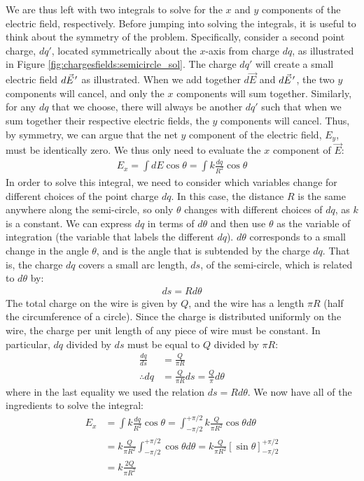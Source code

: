 We are thus left with two integrals to solve for the $x$ and $y$ components of the electric field, respectively. Before jumping into solving the integrals, it is useful to think about the symmetry of the problem. Specifically, consider a second point charge, $dq'$, located symmetrically about the $x$-axis from charge $dq$, as illustrated in Figure \ref{fig:chargesfields:semicircle_sol}. The charge $dq'$ will create a small electric field $d\pvec E'$ as illustrated. When we add together $d\vec E$ and $d\pvec E'$, the two $y$ components will cancel, and only the $x$ components will sum together. Similarly, for any $dq$ that we choose, there will always be another $dq'$ such that when we sum together their respective electric fields, the $y$ components will cancel. Thus, by symmetry, we can argue that the net $y$ component of the electric field, $E_y$, must be identically zero. We thus only need to evaluate the $x$ component of $\vec E$:
\begin{align*}
E_x = \int dE\cos\theta = \int k\frac{dq}{R^2} \cos\theta
\end{align*}
In order to solve this integral, we need to consider which variables change for different choices of the point charge $dq$. In this case, the distance $R$ is the same anywhere along the semi-circle, so only $\theta$ changes with different choices of $dq$, as $k$ is a constant. We can express $dq$ in terms of $d\theta$ and then use $\theta$ as the variable of integration (the variable that labels the different $dq$). $d\theta$ corresponds to a small change in the angle $\theta$, and is the angle that is subtended by the charge $dq$. That is, the charge $dq$ covers a small arc length, $ds$, of the semi-circle, which is related to $d\theta$ by:
\begin{align*}
ds = Rd\theta
\end{align*}
The total charge on the wire is given by $Q$, and the wire has a length $\pi R$ (half the circumference of a circle). Since the charge is distributed uniformly on the wire, the charge per unit length of any piece of wire must be constant. In particular, $dq$ divided by $ds$ must be equal to $Q$ divided by $\pi R$:
\begin{align*}
\frac{dq}{ds}&=\frac{Q}{\pi R}\\
\therefore dq &=\frac{Q}{\pi R}ds=\frac{Q}{\pi}d\theta
\end{align*}
where in the last equality we used the relation $ds=Rd\theta$. We now have all of the ingredients to solve the integral:
\begin{align*}
E_x &= \int k\frac{dq}{R^2} \cos\theta = \int_{-\pi/2}^{+\pi/2} k\frac{Q}{\pi R^2}\cos\theta d\theta\\
&= k\frac{Q}{\pi R^2}\int_{-\pi/2}^{+\pi/2}\cos\theta d\theta=k\frac{Q}{\pi R^2}\left[ \sin\theta \right]_{-\pi/2}^{+\pi/2}\\
&= k\frac{2Q}{\pi R^2}
\end{align*}
